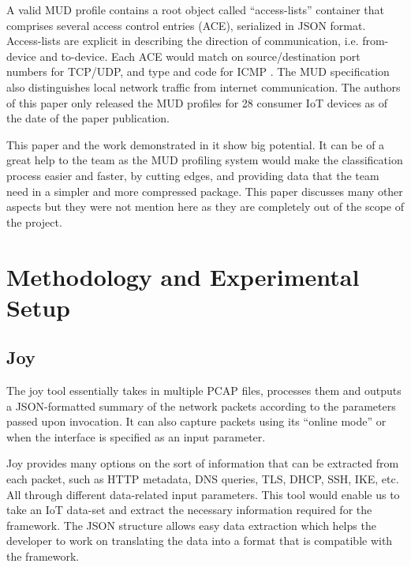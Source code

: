 \documentclass{article}
\begin{document}
A valid MUD profile contains a root object called “access-lists” container that comprises several access control entries (ACE), serialized in JSON format. Access-lists are explicit in describing the direction of communication, i.e. from-device and to-device. Each ACE would match on source/destination port numbers for TCP/UDP, and type and code for ICMP \cite{DetectingVolumetricAttacks}. The MUD specification also distinguishes local network traffic from internet communication. The authors of this paper only released the MUD profiles for 28 consumer IoT devices as of the date of the paper publication. 
\newline

This paper \cite{DetectingVolumetricAttacks} and the work demonstrated in it show big potential. It can be of a great help to the team as the MUD profiling system would make the classification process easier and faster, by cutting edges, and providing data that the team need in a simpler and more compressed package. This paper \cite{DetectingVolumetricAttacks} discusses many other aspects but they were not mention here as they are completely out of the scope of the project.

\pagebreak

\section{Methodology and Experimental Setup}
\subsection{Joy}
The joy tool \cite{joy} essentially takes in multiple PCAP files, processes them and outputs a JSON-formatted summary of the network packets according to the parameters passed upon invocation. It can also capture packets using its “online mode” or when the interface is specified as an input parameter.
\newline 

Joy provides many options on the sort of information that can be extracted from each packet, such as HTTP metadata, DNS queries, TLS, DHCP, SSH, IKE, etc. All through different data-related input parameters. This tool would enable us to take an IoT data-set and extract the necessary information required for the framework. The JSON structure allows easy data extraction which helps the developer to work on translating the data into a format that is compatible with the framework.\newline
\end{document}
